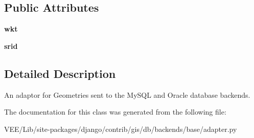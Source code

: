 \subsection*{Public Attributes}
\begin{DoxyCompactItemize}
\item 
\mbox{\label{classdjango_1_1contrib_1_1gis_1_1db_1_1backends_1_1base_1_1adapter_1_1_w_k_t_adapter_a5fbc85990e4e7f3ea81c221366597fc5}} 
{\bfseries wkt}
\item 
\mbox{\label{classdjango_1_1contrib_1_1gis_1_1db_1_1backends_1_1base_1_1adapter_1_1_w_k_t_adapter_a78e2ede1afd8b3d507922f3f007b6994}} 
{\bfseries srid}
\end{DoxyCompactItemize}


\subsection{Detailed Description}
\begin{DoxyVerb}An adaptor for Geometries sent to the MySQL and Oracle database backends.
\end{DoxyVerb}
 

The documentation for this class was generated from the following file\+:\begin{DoxyCompactItemize}
\item 
V\+E\+E/\+Lib/site-\/packages/django/contrib/gis/db/backends/base/adapter.\+py\end{DoxyCompactItemize}
